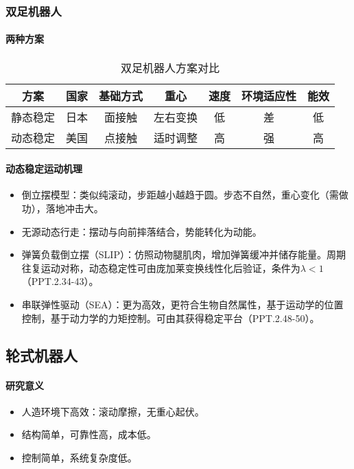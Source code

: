 \documentclass[
12pt, %
a4paper, 
oneside, %
headinclude,footinclude, %
]{scrartcl}
\begin{document}
\subsubsection[双足机器人]{双足机器人}
\paragraph{两种方案}
\begin{table}[H]
\centering
\caption{双足机器人方案对比}
\begin{tabular}{|c|c|c|c|c|c|c|}
\hline
方案 & 国家 & 基础方式 & 重心 & 速度 & 环境适应性 & 能效 \\
\hline
静态稳定 & 日本 & 面接触 & 左右变换 & 低 & 差 & 低 \\
\hline
动态稳定 & 美国 & 点接触 & 适时调整 & 高 & 强 & 高 \\
\hline
\end{tabular}
\end{table}
\paragraph{动态稳定运动机理}
\begin{itemize}
\item 倒立摆模型：类似纯滚动，步距越小越趋于圆。步态不自然，重心变化（需做功），落地冲击大。
\item 无源动态行走：摆动与向前摔落结合，势能转化为动能。
\item 弹簧负载倒立摆（SLIP）：仿照动物腿肌肉，增加弹簧缓冲并储存能量。周期往复运动对称，动态稳定性可由庞加莱变换线性化后验证，条件为$ \lambda < 1 $（PPT.2.34-43）。
\item 串联弹性驱动（SEA）：更为高效，更符合生物自然属性，基于运动学的位置控制，基于动力学的力矩控制。可由其获得稳定平台（PPT.2.48-50）。
\end{itemize}
\subsection[轮式机器人]{轮式机器人}
\paragraph{研究意义}
\begin{itemize}
\item 人造环境下高效：滚动摩擦，无重心起伏。
\item 结构简单，可靠性高，成本低。
\item 控制简单，系统复杂度低。
\end{itemize}
\end{document}
